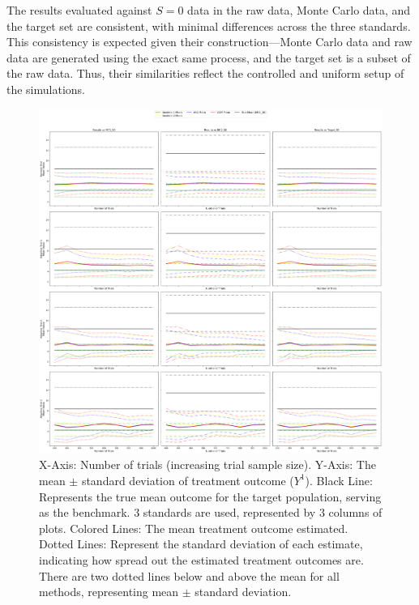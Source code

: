\documentclass[12pt, oneside]{amsart}
\theoremstyle{definition}
\theoremstyle{remark}
\numberwithin{equation}{section}
\begin{document}
The results evaluated against $S=0$ data in the raw data, Monte Carlo data, and the target set are consistent, with minimal differences across the three standards. This consistency is expected given their construction—Monte Carlo data and raw data are generated using the exact same process, and the target set is a subset of the raw data. Thus, their similarities reflect the controlled and uniform setup of the simulations. 

\begin{figure}[hbt!]
    \centering
    \includegraphics[scale=0.15]{Report/Figure/mean_std_results.jpg}
    \caption{X-Axis: Number of trials (increasing trial sample size). Y-Axis: The mean $\pm$ standard deviation of treatment outcome ($Y^1$). Black Line: Represents the true mean outcome for the target population, serving as the benchmark. $3$ standards are used, represented by $3$ columns of plots. Colored Lines: The mean treatment outcome estimated. Dotted Lines: Represent the standard deviation of each estimate, indicating how spread out the estimated treatment outcomes are. There are two dotted lines below and above the mean for all methods, representing mean $\pm$ standard deviation.}
    \label{mean_std_results}
\end{figure}
\FloatBarrier
\end{document}
